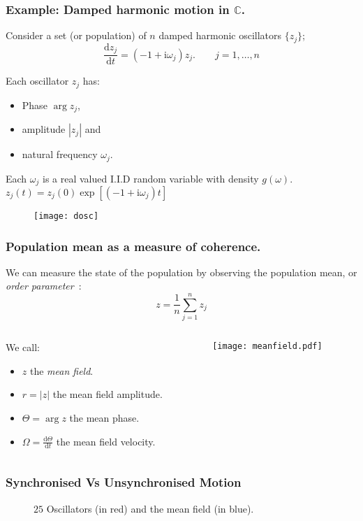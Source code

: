 \documentclass[10pt,reqno]{beamer}
\newcommand{\D}[2]{\frac{\mathrm{d} #1}{\mathrm{d} #2}}
\newcommand{\I}{\mathrm{i}}
\newcommand{\complex}{\mathbb{C}}
\begin{document}
\begin{frame}[t]
\frametitle{Example: Damped harmonic motion in $\complex$.} 
Consider a set (or population) of $n$ damped harmonic oscillators $\{z_j\}$;
\[
\D{z_j}{t} =(-1+\I\omega_j)z_j. \qquad j=1,\ldots,n
\] 
\begin{minipage}{0.49\textwidth}

\vspace{0.5cm}
Each oscillator $z_j$ has:
\begin{itemize}
	\item Phase $\arg{z_j}$,
	\item amplitude $|z_j|$ and 
	\item natural frequency $\omega_j$.
\end{itemize}

Each $\omega_j$ is a real valued I.I.D random variable with density $g(\omega)$.\\

$z_j(t) = z_j(0)\exp[(-1+\I\omega_j)t]$
\end{minipage}
\begin{minipage}{0.49\textwidth}
	\begin{figure}
		\texttt{[image: dosc]}
	\end{figure}
	\centering

\end{minipage}
\end{frame}
\begin{frame}
\frametitle{Population mean as a measure of coherence.}
We can measure the state of the population by observing the population mean, or {\em order parameter}~\cite{kuramoto75}:
\[
z = \frac{1}{n}\sum_{j=1}^n z_j
\]
\begin{columns}
\begin{column}{0.59\textwidth}
	We call:
	\begin{itemize}
		\item $z$ the {\em mean field}.
		\item $r=|z|$ the mean field amplitude.
		\item $\Theta = \arg{z}$ the mean phase.
		\item $\Omega = \D{\Theta}{t}$ the mean field velocity.
	\end{itemize}
\end{column}
\begin{column}{0.39\textwidth}
	\begin{figure}
		\texttt{[image: meanfield.pdf]}
	\end{figure}
\end{column}
\end{columns}
\end{frame}
\begin{frame}
\frametitle{Synchronised Vs Unsynchronised Motion}
\begin{figure}
	\caption{$25$ Oscillators (in red) and the mean field (in blue).}
\end{figure}
\end{frame}
\end{document}
